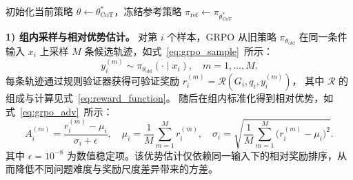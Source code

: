 \begin{algorithm}[t]
\caption{基于 GRPO 的图推理强化学习训练流程}
\label{alg:grpo_graph_reasoning}

初始化当前策略 $\theta \gets \theta_{\mathrm{CoT}}^\ast$，冻结参考策略 $\pi_{\mathrm{ref}} \gets \pi_{\theta_{\mathrm{CoT}}^\ast}$\;

\;
\end{algorithm}


\textbf{1) 组内采样与相对优势估计。}
对第 $i$ 个样本，GRPO 从旧策略 $\pi_{\theta_{\mathrm{old}}}$ 
在同一条件输入 $x_i$ 上采样 $M$ 条候选轨迹，如式~\ref{eq:grpo_sample}\ 所示：
\begin{equation}
  y_i^{(m)} \sim \pi_{\theta_{\mathrm{old}}}(\cdot \mid x_i), \quad m=1,\dots,M.
  \label{eq:grpo_sample}
\end{equation}
每条轨迹通过规则验证器获得可验证奖励 $r_i^{(m)}=\mathcal{R}(G_i,q_i,y_i^{(m)})$，
其中 $\mathcal{R}$ 的组成与计算见式~\ref{eq:reward_function}。
随后在组内标准化得到相对优势，如式~\ref{eq:grpo_adv}\ 所示：
\begin{equation}
  A_i^{(m)}=
  \frac{r_i^{(m)}-\mu_i}{\sigma_i+\epsilon}, \quad
  \mu_i=\frac{1}{M}\sum_{m=1}^{M}r_i^{(m)}, \quad
  \sigma_i=\sqrt{\frac{1}{M}\sum_{m=1}^{M}\big(r_i^{(m)}-\mu_i\big)^2}.
  \label{eq:grpo_adv}
\end{equation}
其中 $\epsilon=10^{-8}$ 为数值稳定项。该优势估计仅依赖同一输入下的相对奖励排序，从而降低不同问题难度与奖励尺度差异带来的方差。

